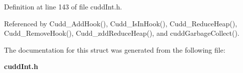 Definition at line 143 of file cudd\-Int.h.

Referenced by Cudd\_\-Add\-Hook(), Cudd\_\-Is\-In\-Hook(), Cudd\_\-Reduce\-Heap(), Cudd\_\-Remove\-Hook(), Cudd\_\-zdd\-Reduce\-Heap(), and cudd\-Garbage\-Collect().

The documentation for this struct was generated from the following file:\begin{CompactItemize}
\item 
\bf{cudd\-Int.h}\end{CompactItemize}
